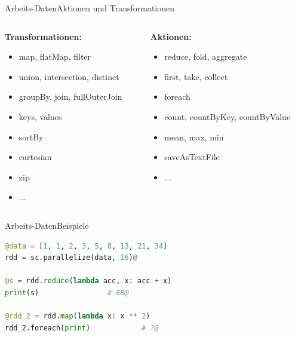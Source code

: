 \begin{frame}{Arbeits-Daten}{Aktionen und Transformationen}
	\begin{columns}[t]
		\begin{column}{0.45\textwidth}
			\textbf{Transformationen:}
			\begin{itemize}
				\item map, flatMap, filter
				\item union, intersection, distinct
				\item groupBy, join, fullOuterJoin
				\item keys, values
				\item sortBy
				\item cartesian
				\item zip
				\item ...
			\end{itemize}
		\end{column}
		\begin{column}{0.45\textwidth}
			\textbf{Aktionen:}
			\begin{itemize}
				\item reduce, fold, aggregate
				\item first, take, collect
				\item foreach
				\item count, countByKey, countByValue
				\item mean, max, min
				\item saveAsTextFile
				\item ...
			\end{itemize}
		\end{column}
	\end{columns}
\end{frame}

\begin{frame}[fragile]{Arbeits-Daten}{Beispiele}
	\begin{lstlisting}[language=python, style=animateblocks]
@data = [1, 1, 2, 3, 5, 8, 13, 21, 34]
rdd = sc.parallelize(data, 16)@

@s = rdd.reduce(lambda acc, x: acc + x)
print(s)				# 88@

@rdd_2 = rdd.map(lambda x: x ** 2)
rdd_2.foreach(print)			# ?@
	\end{lstlisting}
\end{frame}

